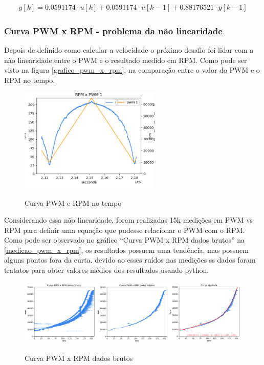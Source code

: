 \begin{equation}
    \begin{split}
        y[k] = 0.0591174 \cdot u \left[ k \right] +  0.0591174 \cdot u[k - 1] + 0.88176521 \cdot y[k - 1]
    \end{split}
    \label{equacao_diferenca}
\end{equation}

\subsubsection{Curva PWM x RPM - problema da não linearidade}

Depois de definido como calcular a velocidade o próximo desafio foi lidar com a não linearidade entre o PWM e o resultado medido em RPM.
Como pode ser visto na figura \autoref{grafico_pwm_x_rpm}, na comparação entre o valor do PWM e o RPM no tempo.

\begin{figure}[ht]
	\centering
	\caption{Curva PWM e RPM no tempo}
	\includegraphics[width=0.6\textwidth]{figures/pwm_x_rpm}
	\label{grafico_pwm_x_rpm}
\end{figure}

Considerando essa não linearidade, foram realizadas 15k medições em PWM vs RPM para definir uma equação que pudesse relacionar o PWM com o RPM.
Como pode ser observado no gráfico ``Curva PWM x RPM dados brutos'' na \autoref{medicao_pwm_x_rpm},
os resultados possuem uma tendência, mas possuem alguns pontos fora da curta.
devido ao esses ruídos nas medições ss dados foram tratatos para obter valores médios dos resultados usando python.

\begin{figure}[ht]
	\centering
	\caption{Curva PWM x RPM dados brutos}
	\includegraphics[width=1\textwidth]{figures/curva_pwm_x_rpm_dados}
	\label{medicao_pwm_x_rpm}
\end{figure}

